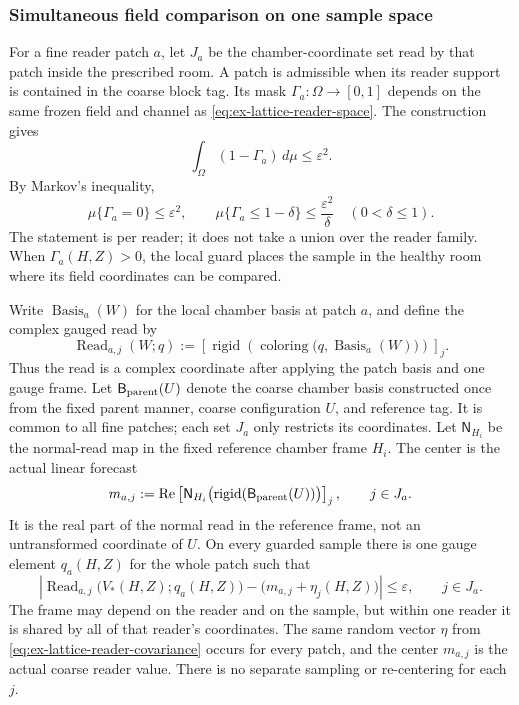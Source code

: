 \subsubsection{Simultaneous field comparison on one sample space}

For a fine reader patch $a$, let $J_a$ be the chamber-coordinate set read
by that patch inside the prescribed room. A patch is admissible when its
reader support is contained in the coarse block tag. Its mask
$\Gamma_a:\Omega\to[0,1]$ depends on the same frozen field and channel as
\eqref{eq:ex-lattice-reader-space}. The construction gives
\begin{equation}\label{eq:ex-lattice-reader-guard}
 \int_\Omega(1-\Gamma_a)\,d\mu\le\varepsilon^2.
\end{equation}
By Markov's inequality,
\[
 \mu\{\Gamma_a=0\}\le\varepsilon^2,
 \qquad
 \mu\{\Gamma_a\le1-\delta\}\le\frac{\varepsilon^2}{\delta}
 \quad(0<\delta\le1).
\]
The statement is per reader; it does not take a union over the reader
family. When $\Gamma_a(H,Z)>0$,
the local guard places the sample in the healthy room where its field
coordinates can be compared.

Write $\operatorname{Basis}_a(W)$ for the local chamber basis at patch $a$,
and define the complex gauged read by
\[
 \operatorname{Read}_{a,j}(W;q)
 :=\left[\operatorname{rigid}\!\left(
       \operatorname{coloring}\bigl(q,\operatorname{Basis}_a(W)\bigr)
      \right)\right]_j.
\]
Thus the read is a complex coordinate after applying the patch basis and one
gauge frame. Let $\mathsf B_{\rm parent}(U)$ denote the coarse chamber basis
constructed once from the fixed parent manner, coarse configuration $U$,
and reference tag. It is common to all fine patches; each set $J_a$ only
restricts its coordinates. Let $\mathsf N_{H_i}$ be the normal-read map in
the fixed reference chamber frame $H_i$. The center is the actual linear
forecast
\[
 m_{a,j}:=\operatorname{Re}\left[
   \mathsf N_{H_i}\bigl(\operatorname{rigid}(\mathsf B_{\rm parent}(U))\bigr)
 \right]_j,
 \qquad j\in J_a.
\]
It is the real part of the normal read in the reference frame, not an
untransformed coordinate of $U$. On every guarded sample there is one gauge
element $q_a(H,Z)$ for the whole patch such that
\begin{equation}\label{eq:ex-lattice-reader-coordinate}
 \left|
  \operatorname{Read}_{a,j}\bigl(V_*(H,Z);q_a(H,Z)\bigr)
       -\bigl(m_{a,j}+\eta_j(H,Z)\bigr)
 \right|\le\varepsilon,
 \qquad j\in J_a.
\end{equation}
The frame may depend on the reader and on the sample, but within one
reader it is shared by all of that reader's coordinates. The same random
vector $\eta$ from \eqref{eq:ex-lattice-reader-covariance} occurs for every patch, and the center $m_{a,j}$
is the actual coarse reader value. There is no separate sampling or
re-centering for each $j$.


